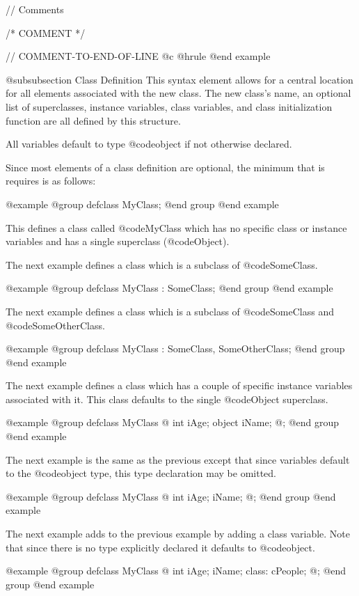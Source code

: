 //  Comments

/*  COMMENT  */

//  COMMENT-TO-END-OF-LINE
@c @hrule
@end example

@subsubsection Class Definition
This syntax element allows for a central location for all elements
associated with the new class.  The new class's name, an optional
list of superclasses, instance variables, class variables, and
class initialization function are all defined by this structure.

All variables default to type @code{object} if not otherwise
declared.

Since most elements of a class definition are optional, the minimum
that is requires is as follows:

@example
@group
defclass   MyClass;
@end group
@end example


This defines a class called @code{MyClass} which has no specific class
or instance variables and has a single superclass (@code{Object}).

The next example defines a class which is a subclass of @code{SomeClass}.

@example
@group
defclass   MyClass : SomeClass;
@end group
@end example


The next example defines a class which is a subclass of @code{SomeClass}
and @code{SomeOtherClass}.

@example
@group
defclass   MyClass : SomeClass, SomeOtherClass;
@end group
@end example


The next example defines a class which has a couple of specific
instance variables associated with it.  This class defaults to
the single @code{Object} superclass.

@example
@group
defclass   MyClass  @{
        int     iAge;
        object  iName;
@};
@end group
@end example

The next example is the same as the previous except that since
variables default to the @code{object} type, this type declaration
may be omitted.

@example
@group
defclass   MyClass  @{
        int     iAge;
        iName;
@};
@end group
@end example


The next example adds to the previous example by adding a class variable.
Note that since there is no type explicitly declared it defaults to
@code{object}.

@example
@group
defclass   MyClass  @{
        int     iAge;
        iName;
 class:
        cPeople;
@};
@end group
@end example


